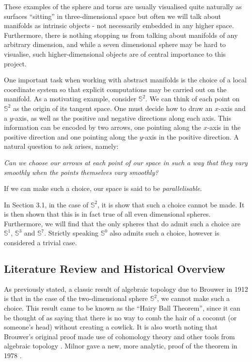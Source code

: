 \documentclass[12pt,a4paper]{article}
\numberwithin{equation}{section}
\theoremstyle{definition}
\theoremstyle{remark}
\begin{document}
These examples of the sphere and torus are usually visualised quite naturally as surfaces ``sitting'' in three-dimensional space but often we will talk about manifolds as intrinsic objects - not necessarily embedded in any higher space. Furthermore, there is nothing stopping us from talking about manifolds of any arbitrary dimension, and while a seven dimensional sphere may be hard to visualise, such higher-dimensional objects are of central importance to this project.\\

\pagebreak

One important task when working with abstract manifolds is the choice of a local coordinate system so that explicit computations may be carried out on the manifold. As a motivating example, consider $\mathbb{S}^2$. We can think of each point on $\mathbb{S}^2$ as the origin of its tangent space. One must decide how to draw an $x$-axis and a $y$-axis, as well as the positive and negative directions along each axis. This information can be encoded by two arrows, one pointing along the $x$-axis in the positive direction and one pointing along the $y$-axis in the positive direction. A natural question to ask arises, namely:
\begin{center}
\textit{Can we choose our arrows at each point of our space in such a way that they vary smoothly when the points themselves vary smoothly?}
\end{center} 
If we can make such a choice, our space is said to be \textit{parallelisable}.

In Section 3.1, in the case of $\mathbb{S}^2$, it is show that such a choice cannot be made. It is then shown that this is in fact true of all even dimensional spheres. Furthermore, we will find that the only spheres that do admit such a choice are $\mathbb{S}^1$, $\mathbb{S}^3$ and $\mathbb{S}^7$. Strictly speaking $\mathbb{S}^0$ also admits such a choice, however is considered a trivial case.

\subsection{Literature Review and Historical Overview}
As previously stated, a classic result of algebraic topology due to Brouwer in 1912 \cite{MR1511678} is that in the case of the two-dimensional sphere $\mathbb{S}^2$, we cannot make such a choice. This result came to be known as the ``Hairy Ball Theorem'', since it can be thought of as saying that there is no way to comb the hair of a coconut (or someone's head) without creating a cowlick. It is also worth noting that Brouwer's original proof made use of cohomology theory and other tools from algebraic topology \cite{MR1415833}. Milnor gave a new, more analytic, proof of the theorem in 1978 \cite{MR505523}.\\
\end{document}
